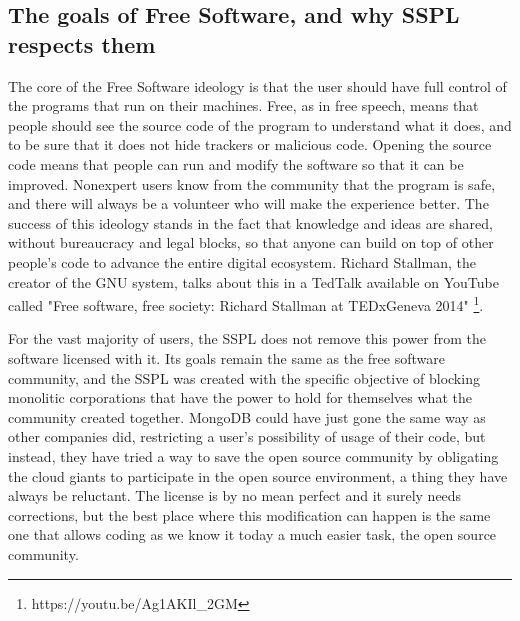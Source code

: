 \documentclass[12pt, a4paper]{article}
\begin{document}
  \subsection{The goals of Free Software, and why SSPL respects them}
  The core of the Free Software ideology is that the user should have full control of the programs that run on their machines. Free, as in free speech, means that people should see the source code of the program to understand what it does, and to be sure that it does not hide trackers or malicious code. Opening the source code means that people can run and modify the software so that it can be improved. Nonexpert users know from the community that the program is safe, and there will always be a volunteer who will make the experience better. The success of this ideology stands in the fact that knowledge and ideas are shared, without bureaucracy and legal blocks, so that anyone can build on top of other people's code to advance the entire digital ecosystem. Richard Stallman, the creator of the GNU system, talks about this in a TedTalk available on YouTube called "Free software, free society: Richard Stallman at TEDxGeneva 2014" \footnote{https://youtu.be/Ag1AKIl\_2GM}.

  For the vast majority of users, the SSPL does not remove this power from the software licensed with it. Its goals remain the same as the free software community, and the SSPL was created with the specific objective of blocking monolitic corporations that have the power to hold for themselves what the community created together. MongoDB could have just gone the same way as other companies did, restricting a user's possibility of usage of their code, but instead, they have tried a way to save the open source community by obligating the cloud giants to participate in the open source environment, a thing they have always be reluctant. The license is by no mean perfect and it surely needs corrections, but the best place where this modification can happen is the same one that allows coding as we know it today a much easier task, the open source community. 

  \pagebreak
\end{document}

